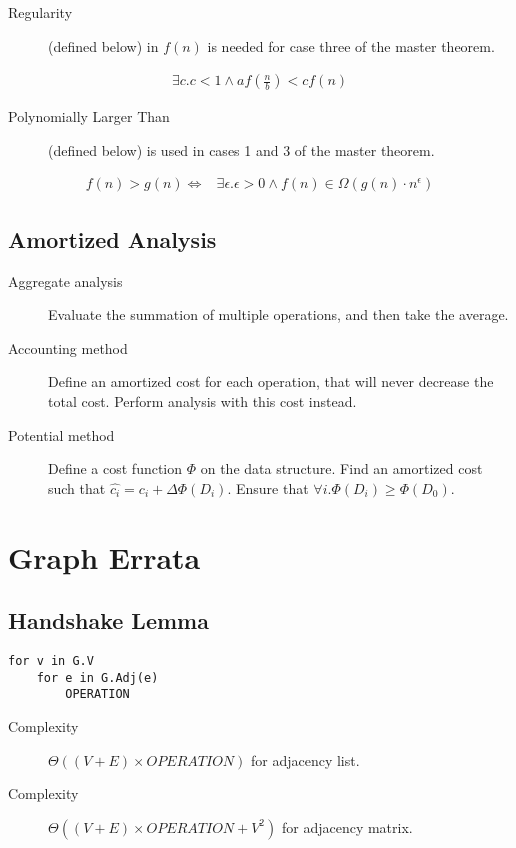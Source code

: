 \documentclass[landscape]{cheat}
\begin{document}
\begin{multicols*}{3}
\begin{description}
    \item[Regularity] (defined below) in $f(n)$ is needed for case three of the master theorem.
\end{description}
\begin{align*}
    \exists c. c < 1 \land af\left(\frac n b\right) < cf(n)
\end{align*}
\begin{description}
    \item[Polynomially Larger Than] (defined below) is used in cases 1 and 3 of the master theorem.
\end{description}
\begin{align*}
    f(n) > g(n) \Leftrightarrow& \exists \epsilon. \epsilon > 0 \land f(n) \in \Omega(g(n) \cdot n^\epsilon)
\end{align*}

\subsection{Amortized Analysis}
\begin{description}
    \item[Aggregate analysis] Evaluate the summation of multiple operations, and then take the average.
    \item[Accounting method] Define an amortized cost for each operation, that will never decrease the total cost.
        Perform analysis with this cost instead.
    \item[Potential method] Define a cost function $\Phi$ on the data structure. Find an amortized cost such that $\hat{c_i} = c_i + \Delta \Phi(D_i)$.
        Ensure that $\forall i. \Phi(D_i) \geq \Phi(D_0)$.
\end{description}

\section{Graph Errata}
\subsection{Handshake Lemma}
\begin{lstlisting}
for v in G.V
    for e in G.Adj(e)
        OPERATION
\end{lstlisting}
\begin{description}
    \item[Complexity] $\Theta((V+E) \times OPERATION)$ for adjacency list.
    \item[Complexity] $\Theta((V+E) \times OPERATION + V^2)$ for adjacency matrix.
\end{description}


\end{multicols*}
\end{document}
